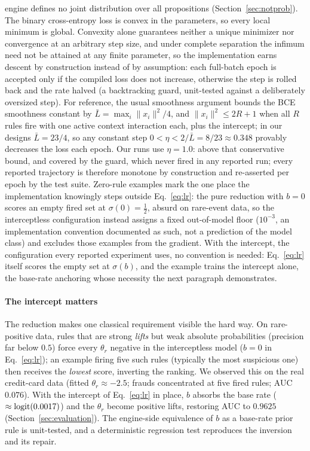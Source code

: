 engine defines no joint distribution over all propositions
(Section~\ref{sec:notprob}). The binary cross-entropy loss is
convex in the parameters, so every local minimum is global.
Convexity alone guarantees neither a unique minimizer nor convergence
at an arbitrary step size, and under complete separation the infimum
need not be attained at any finite parameter, so the implementation
earns descent by construction instead of by assumption: each
full-batch epoch is accepted only if the compiled loss does not
increase, otherwise the step is rolled back and the rate halved (a
backtracking guard, unit-tested against a deliberately oversized
step). For reference, the usual smoothness argument bounds the BCE
smoothness constant by $\bar{L} = \max_i \lVert x_i\rVert^2/4$, and
$\lVert x_i\rVert^2 \le 2R + 1$ when all $R$ rules fire with one
active context interaction each, plus the intercept; in our designs
$\bar{L} = 23/4$, so any constant step
$0 < \eta < 2/\bar{L} = 8/23 \approx 0.348$ provably decreases the
loss each epoch. Our runs use $\eta = 1.0$: above that conservative
bound, and covered by the guard, which never fired in any reported
run; every reported trajectory is therefore monotone by construction
and re-asserted per epoch by the test suite. Zero-rule examples mark
the one place the implementation knowingly steps outside
Eq.~\eqref{eq:lr}: the pure reduction with $b = 0$ scores an empty
fired set at $\sigma(0) = \tfrac12$, absurd on rare-event data, so the
interceptless configuration instead assigns a fixed out-of-model floor
($10^{-3}$, an implementation convention documented as such, not a
prediction of the model class) and excludes those examples from the
gradient. With the intercept, the configuration every reported
experiment uses, no convention is needed: Eq.~\eqref{eq:lr} itself
scores the empty set at $\sigma(b)$, and the example trains the
intercept alone, the base-rate anchoring whose necessity the next
paragraph demonstrates.

\paragraph{The intercept matters} The reduction makes one classical
requirement visible the hard way. On rare-positive data, rules that are
strong \emph{lifts} but weak absolute probabilities (precision far below
$0.5$) force every $\theta_r$ negative in the interceptless model
($b = 0$ in Eq.~\eqref{eq:lr}); an
example firing five such rules (typically the most suspicious one)
then receives the \emph{lowest} score, inverting the ranking. We
observed this on the real credit-card data (fitted
$\theta_r \approx -2.5$; frauds concentrated at five fired rules; AUC
$0.076$). With the intercept of Eq.~\eqref{eq:lr} in place, $b$
absorbs the base rate
($\approx \operatorname{logit}(0.0017)$) and the $\theta_r$ become positive lifts,
restoring AUC to $0.9625$ (Section~\ref{sec:evaluation}). The
engine-side equivalence of $b$ as a base-rate prior rule is
unit-tested, and a deterministic regression test reproduces the
inversion and its repair.

